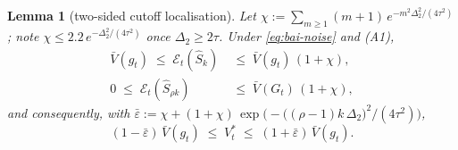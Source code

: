 \documentclass[11pt]{article}
\newtheorem{lemma}{Lemma}
\theoremstyle{remark}
\begin{document}
\begin{lemma}[two-sided cutoff localisation]\label{lem:localisation}
Let $\chi := \sum_{m \ge 1} (m+1)\, e^{-m^2 \Delta_2^2/(4\tau^2)}$; note $\chi \le 2.2\, e^{-\Delta_2^2/(4\tau^2)}$ once $\Delta_2 \ge 2\tau$. Under \eqref{eq:bai-noise} and (A1),
\begin{align}
\bar V(g_t) \;\le\; \mathcal E_t(\widehat S_k) \;&\le\; \bar V(g_t)\,(1 + \chi), \label{eq:loc-k}\\
0 \;\le\; \mathcal E_t(\widehat S_{\rho k}) \;&\le\; \bar V(G_t)\,(1 + \chi), \label{eq:loc-rho}
\end{align}
and consequently, with $\bar\varepsilon := \chi + (1+\chi)\, \exp\bigl(-\bigl((\rho-1)k\,\Delta_2\bigr)^2/(4\tau^2)\bigr)$,
\begin{equation}\label{eq:V-sandwich}
(1 - \bar\varepsilon)\,\bar V(g_t) \;\le\; V^*_t \;\le\; (1 + \bar\varepsilon)\,\bar V(g_t).
\end{equation}
\end{lemma}
\end{document}
